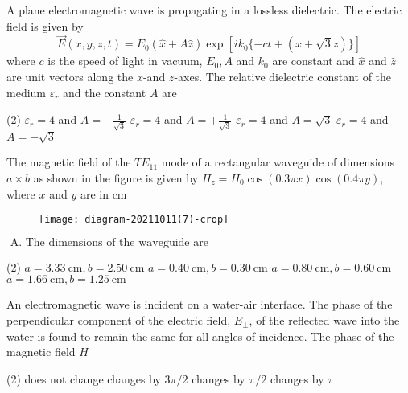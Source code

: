 \begin{enumerate}
\begin{minipage}{\textwidth}
	\item A plane electromagnetic wave is propagating in a lossless dielectric. The electric field is given by
	$$
	\vec{E}(x, y, z, t)=E_{0}(\hat{x}+A \hat{z}) \exp \left[i k_{0}\{-c t+(x+\sqrt{3} z)\}\right]
	$$
	where $c$ is the speed of light in vacuum, $E_{0}, A$ and $k_{0}$ are constant and $\hat{x}$ and $\hat{z}$ are unit vectors along the $x$-and $z$-axes. The relative dielectric constant of the medium $\varepsilon_{r}$ and the constant $A$ are
\end{minipage}
\begin{tasks}(2)
	\task[\textbf{A.}]$\varepsilon_{r}=4$ and $A=-\frac{1}{\sqrt{3}}$
	\task[\textbf{B.}]$\varepsilon_{r}=4$ and $A=+\frac{1}{\sqrt{3}}$
	\task[\textbf{C.}]$\varepsilon_{r}=4$ and $A=\sqrt{3}$
	\task[\textbf{D.}]$\varepsilon_{r}=4$ and $A=-\sqrt{3}$
\end{tasks}
\begin{minipage}{\textwidth}
	\item The magnetic field of the $T E_{11}$ mode of a rectangular waveguide of dimensions $a \times b$ as shown in the figure is given by $H_{z}=H_{0} \cos (0.3 \pi x) \cos (0.4 \pi y)$, where $x$ and $y$ are in cm
	\begin{figure}[H]
		\centering
		\texttt{[image: diagram-20211011(7)-crop]}
		\caption{}
		\label{}
	\end{figure}
\end{minipage}
$\text { A. The dimensions of the waveguide are }$
\begin{tasks}(2)
	\task[\textbf{A.}] $a=3.33 \mathrm{~cm}, b=2.50 \mathrm{~cm}$
	\task[\textbf{B.}]$a=0.40 \mathrm{~cm}, b=0.30 \mathrm{~cm}$
	\task[\textbf{C.}]$a=0.80 \mathrm{~cm}, b=0.60 \mathrm{~cm}$
	\task[\textbf{D.}] $a=1.66 \mathrm{~cm}, b=1.25 \mathrm{~cm}$
\end{tasks}

\begin{minipage}{\textwidth}
	\item An electromagnetic wave is incident on a water-air interface. The phase of the perpendicular component of the electric field, $E_{\perp}$, of the reflected wave into the water is found to remain the same for all angles of incidence. The phase of the magnetic field $H$
\end{minipage}
\begin{tasks}(2)
	\task[\textbf{A.}]does not change
	\task[\textbf{B.}]changes by $3 \pi / 2$
	\task[\textbf{C.}]changes by $\pi / 2$
	\task[\textbf{D.}]changes by $\pi$
\end{tasks}


\end{enumerate}
